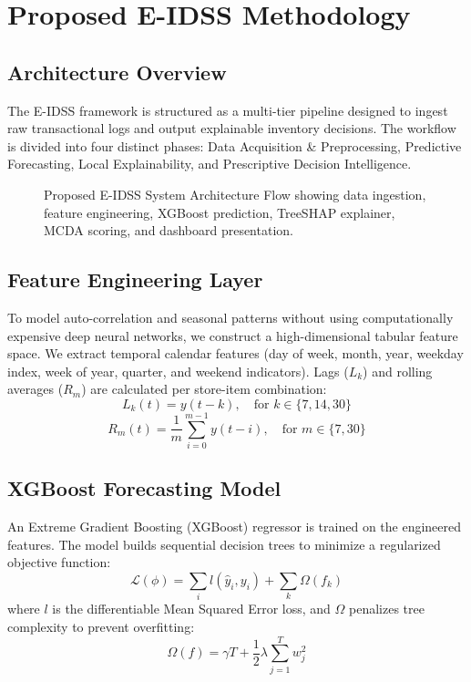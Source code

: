 \documentclass[conference]{IEEEtran}
\begin{document}
\section{Proposed E-IDSS Methodology}

\subsection{Architecture Overview}
The E-IDSS framework is structured as a multi-tier pipeline designed to ingest raw transactional logs and output explainable inventory decisions. The workflow is divided into four distinct phases: Data Acquisition \& Preprocessing, Predictive Forecasting, Local Explainability, and Prescriptive Decision Intelligence.

\begin{figure}[htbp]
\centering
{}
\caption{Proposed E-IDSS System Architecture Flow showing data ingestion, feature engineering, XGBoost prediction, TreeSHAP explainer, MCDA scoring, and dashboard presentation.}
\label{fig:sys_arch}
\end{figure}

\subsection{Feature Engineering Layer}
To model auto-correlation and seasonal patterns without using computationally expensive deep neural networks, we construct a high-dimensional tabular feature space. We extract temporal calendar features (day of week, month, year, weekday index, week of year, quarter, and weekend indicators). Lags ($L_k$) and rolling averages ($R_m$) are calculated per store-item combination:
\begin{equation}
L_k(t) = y(t - k), \quad \text{for } k \in \{7, 14, 30\}
\end{equation}
\begin{equation}
R_m(t) = \frac{1}{m} \sum_{i=0}^{m-1} y(t - i), \quad \text{for } m \in \{7, 30\}
\end{equation}

\subsection{XGBoost Forecasting Model}
An Extreme Gradient Boosting (XGBoost) regressor is trained on the engineered features. The model builds sequential decision trees to minimize a regularized objective function:
\begin{equation}
\mathcal{L}(\phi) = \sum_{i} l(\hat{y}_i, y_i) + \sum_{k} \Omega(f_k)
\end{equation}
where $l$ is the differentiable Mean Squared Error loss, and $\Omega$ penalizes tree complexity to prevent overfitting:
\begin{equation}
\Omega(f) = \gamma T + \frac{1}{2} \lambda \sum_{j=1}^{T} w_j^2
\end{equation}
\end{document}
